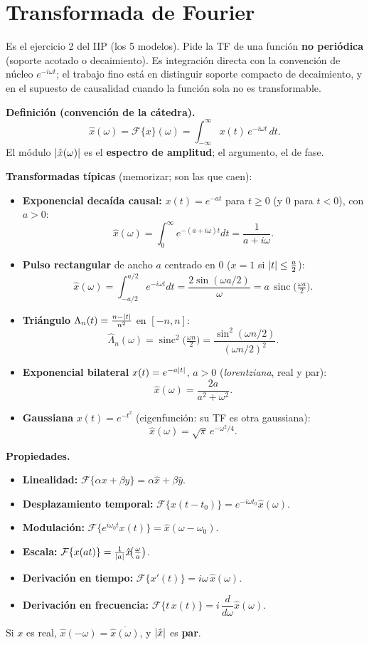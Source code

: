 \section{Transformada de Fourier}

Es el ejercicio 2 del IIP (los 5 modelos). Pide la TF de una función \textbf{no periódica} (soporte acotado o decaimiento). Es integración directa con la convención de núcleo $e^{-i\omega t}$; el trabajo fino está en distinguir soporte compacto de decaimiento, y en el supuesto de causalidad cuando la función sola no es transformable.

\begin{teoria}
\textbf{Definición (convención de la cátedra).}
\[
\hat x(\omega)=\mathcal F\{x\}(\omega)=\int_{-\infty}^{\infty}x(t)\,e^{-i\omega t}\,dt.
\]
El módulo $\left\lvert \hat x(\omega) \right\rvert$ es el \textbf{espectro de amplitud}; el argumento, el de fase.

\medskip
\textbf{Transformadas típicas} (memorizar; son las que caen):
\begin{itemize}
\item \textbf{Exponencial decaída causal:} $x(t)=e^{-at}$ para $t\ge0$ (y $0$ para $t<0$), con $a>0$:
\[
\hat x(\omega)=\int_0^\infty e^{-(a+i\omega)t}dt=\frac{1}{a+i\omega}.
\]
\item \textbf{Pulso rectangular} de ancho $a$ centrado en $0$ ($x=1$ si $\left\lvert t \right\rvert\le\tfrac a2$):
\[
\hat x(\omega)=\int_{-a/2}^{a/2}e^{-i\omega t}dt=\frac{2\sin(\omega a/2)}{\omega}=a\,\operatorname{sinc}\!\Big(\tfrac{\omega a}{2}\Big).
\]
\item \textbf{Triángulo} $\Lambda_n(t)=\tfrac{n-\left\lvert t \right\rvert}{n^2}$ en $[-n,n]$:
\[
\hat\Lambda_n(\omega)=\operatorname{sinc}^2\!\Big(\tfrac{\omega n}{2}\Big)=\frac{\sin^2(\omega n/2)}{(\omega n/2)^2}.
\]
\item \textbf{Exponencial bilateral} $x(t)=e^{-a\left\lvert t \right\rvert}$, $a>0$ (\emph{lorentziana}, real y par):
\[
\hat x(\omega)=\frac{2a}{a^2+\omega^2}.
\]
\item \textbf{Gaussiana} $x(t)=e^{-t^2}$ (eigenfunción: su TF es otra gaussiana):
\[
\hat x(\omega)=\sqrt\pi\,e^{-\omega^2/4}.
\]
\end{itemize}

\medskip
\textbf{Propiedades.}
\begin{itemize}
\item \textbf{Linealidad:} $\mathcal F\{\alpha x+\beta y\}=\alpha\hat x+\beta\hat y$.
\item \textbf{Desplazamiento temporal:} $\mathcal F\{x(t-t_0)\}=e^{-i\omega t_0}\hat x(\omega)$.
\item \textbf{Modulación:} $\mathcal F\{e^{i\omega_0 t}x(t)\}=\hat x(\omega-\omega_0)$.
\item \textbf{Escala:} $\mathcal F\{x(at)\}=\tfrac{1}{\left\lvert a \right\rvert}\hat x\!\big(\tfrac\omega a\big)$.
\item \textbf{Derivación en tiempo:} $\mathcal F\{x'(t)\}=i\omega\,\hat x(\omega)$.
\item \textbf{Derivación en frecuencia:} $\mathcal F\{t\,x(t)\}=i\,\dfrac{d}{d\omega}\hat x(\omega)$.
\end{itemize}
Si $x$ es real, $\hat x(-\omega)=\overline{\hat x(\omega)}$, y $\left\lvert \hat x \right\rvert$ es \textbf{par}.
\end{teoria}

